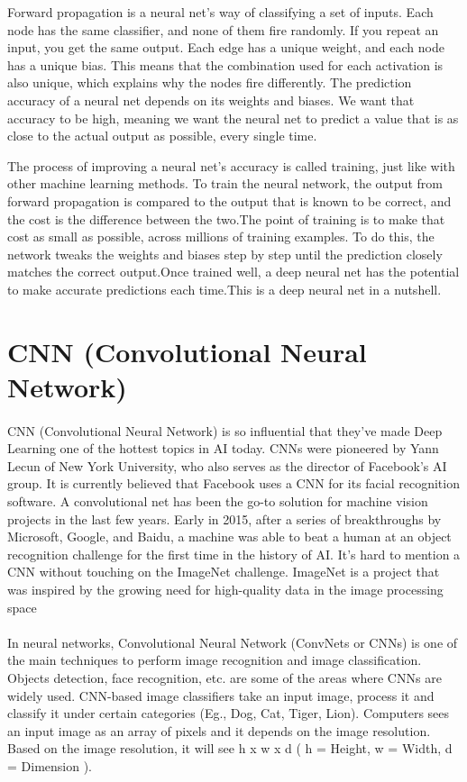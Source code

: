 Forward propagation is a neural net's way of classifying a set of inputs. Each node has the same classifier, and none of them fire randomly. If you repeat an input, you get the same output. Each edge has a unique weight, and each node has a unique bias. This means that the combination used for each activation is also unique, which explains why the nodes fire differently. The prediction accuracy of a neural net depends on its weights and biases. We want that accuracy to be high, meaning we want the neural net to predict a value that is as close to the actual output as possible, every single time.

The process of improving a neural net’s accuracy is called training, just like with other machine learning methods. To train the neural network, the output from forward propagation is compared to the output that is known to be correct, and the cost is the difference between the two.The point of training is to make that cost as small as possible, across millions of training examples. To do this, the network tweaks the weights and biases step by step
until the prediction closely matches the correct output.Once trained well, a deep neural net has the potential to make accurate predictions each time.This is a deep neural net in a nutshell.


\section{CNN (Convolutional Neural Network) }
\paragraph{}
CNN (Convolutional Neural Network) is so influential that they’ve made Deep Learning one of the hottest topics in AI today. CNNs were pioneered by Yann Lecun of New York University, who also serves as the director of Facebook's AI group. It is currently believed that Facebook uses a CNN for its facial recognition software. A convolutional net has been the go-to solution for machine vision projects in the last few years. Early in 2015, after a series of breakthroughs by Microsoft, Google, and Baidu, a machine was able to beat a human at an object recognition challenge for the first time in the history of AI. It’s hard to mention a CNN without touching on the ImageNet challenge. ImageNet is a project that was inspired by the growing need for high-quality data in the image processing space
\paragraph{}
In neural networks, Convolutional Neural Network (ConvNets or CNNs) is one of the main techniques to perform image recognition and image classification. Objects detection, face recognition, etc. are some of the areas where CNNs are widely used.
CNN-based image classifiers take an input image, process it and classify it under certain categories (Eg., Dog, Cat, Tiger, Lion). Computers sees an input image as an array of pixels and it depends on the image resolution. Based on the image resolution, it will see h x w x d ( h = Height, w = Width, d = Dimension ).

